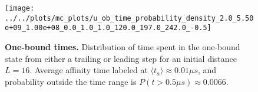 \begin{figure}[H]
	\centering
	\texttt{[image: ../../plots/mc\_plots/u\_ob\_time\_probability\_density\_2.0\_5.50e+09\_1.00e+08\_0.0\_1.0\_1.0\_120.0\_197.0\_242.0\_-0.5]}
	\caption[One-bound times]{\textbf{One-bound times.} Distribution of time spent in the one-bound state from either a trailing or leading step for an initial distance $L=16$. Average affinity time labeled at $\langle t_a \rangle \approx 0.01 \mu s$, and probability outside the time range is $P(t>0.5\mu s) \approx 0.0066$.}
	\label{fig:OBtime09}
\end{figure}


%

